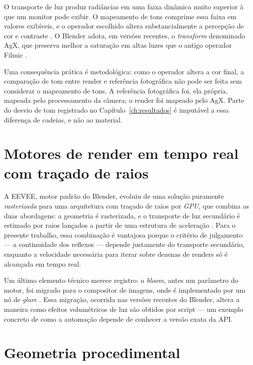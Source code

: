 O transporte de luz produz radi\^ancias em uma faixa din\^amica muito superior \`a que um
monitor pode exibir. O mapeamento de tons comprime essa faixa em valores exib\'iveis, e o
operador escolhido altera substancialmente a percep\c{c}\~ao de cor e contraste
\cite{reinhard2002, fairchild2013}. O Blender adota, em vers\~oes recentes, o \emph{transform}
denominado AgX, que preserva melhor a satura\c{c}\~ao em altas luzes que o antigo operador
Filmic \cite{blender5manual}.

Uma consequ\^encia pr\'atica \'e metodol\'ogica: como o operador altera a cor final, a
comparação de tom entre render e refer\^encia fotogr\'afica n\~ao pode ser feita sem considerar o
mapeamento de tons. A refer\^encia fotogr\'afica foi, ela pr\'opria, mapeada pelo
processamento da c\^amera; o render foi mapeado pelo AgX. Parte do desvio de tom registrado no
Cap\'itulo~\ref{ch:resultados} \'e imput\'avel a essa diferen\c{c}a de cadeias, e n\~ao ao
material.

\section{Motores de render em tempo real com tra\c{c}ado de raios}

A EEVEE, motor padr\~ao do Blender, evoluiu de uma solu\c{c}\~ao puramente \emph{rasterizada}
para uma arquitetura com tra\c{c}ado de raios por \emph{GPU}, que combina as duas abordagens: a
geometria \'e rasterizada, e o transporte de luz secund\'ario \'e estimado por raios lan\c{c}ados
a partir de uma estrutura de acelera\c{c}\~ao \cite{blender5manual}. Para o presente trabalho,
essa combina\c{c}\~ao \'e vantajosa porque o crit\'erio de julgamento --- a continuidade dos
reflexos --- depende justamente do transporte secund\'ario, enquanto a velocidade necess\'aria
para iterar sobre dezenas de renders s\'o \'e alcan\c{c}ada em tempo real.

Um \'ultimo elemento t\'ecnico merece registro: o \emph{bloom}, antes um par\^ametro do motor, foi
migrado para o compositor de imagens, onde \'e implementado por um n\'o de \emph{glare}
\cite{blender5manual}. Essa migra\c{c}\~ao, ocorrida nas vers\~oes recentes do Blender, altera a
maneira como efeitos volum\'etricos de luz s\~ao obtidos por script --- um exemplo concreto de
como a automa\c{c}\~ao depende de conhecer a vers\~ao exata da API.

\section{Geometria procedimental}

